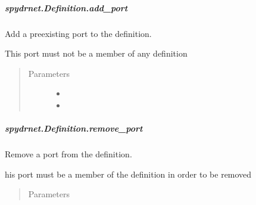 \documentclass[letterpaper,10pt,english,openany,oneside]{sphinxmanual}
\begin{document}
\subparagraph{spydrnet.Definition.add\_port}
\label{\detokenize{reference/classes/generated/spydrnet.Definition.add_port:spydrnet-definition-add-port}}\label{\detokenize{reference/classes/generated/spydrnet.Definition.add_port::doc}}

\begin{fulllineitems}
\label{\detokenize{reference/classes/generated/spydrnet.Definition.add_port:spydrnet.Definition.add_port}}
Add a preexisting port to the definition.

This port must not be a member of any definition
\begin{quote}\begin{description}
\item[{Parameters}] \leavevmode\begin{itemize}
\item {} 

\item {} 

\end{itemize}

\end{description}\end{quote}

\end{fulllineitems}



\subparagraph{spydrnet.Definition.remove\_port}
\label{\detokenize{reference/classes/generated/spydrnet.Definition.remove_port:spydrnet-definition-remove-port}}\label{\detokenize{reference/classes/generated/spydrnet.Definition.remove_port::doc}}

\begin{fulllineitems}
\label{\detokenize{reference/classes/generated/spydrnet.Definition.remove_port:spydrnet.Definition.remove_port}}
Remove a port from the definition.

his port must be a member of the definition in order to be removed
\begin{quote}\begin{description}
\item[{Parameters}] \leavevmode
{}

\end{description}\end{quote}

\end{fulllineitems}
\end{document}
